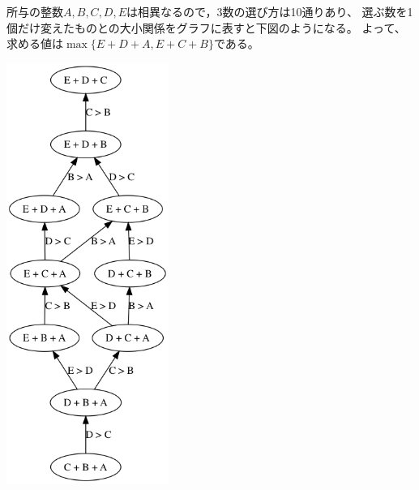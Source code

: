 \documentclass{article}
\begin{document}
所与の整数$A, B, C, D, E$は相異なるので，3数の選び方は10通りあり、
選ぶ数を1個だけ変えたものとの大小関係をグラフに表すと下図のようになる。
よって、求める値は$\max \{ E + D + A, E + C + B \}$である。

\vspace{20pt}
\begin{center}
    \includegraphics[width=150pt]{graph.png}
\end{center}
\end{document}
